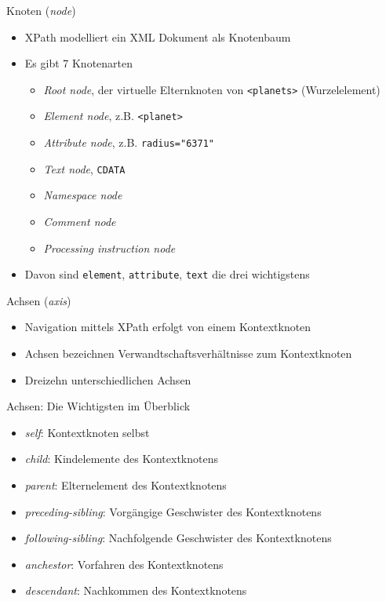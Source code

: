 \documentclass{beamer}
\begin{document}
\begin{frame}{Knoten (\emph{node})}
	
	\begin{itemize}
		\item XPath modelliert ein XML Dokument als Knotenbaum
		\item Es gibt 7 Knotenarten
		\begin{itemize}
			\item \emph{Root node}, der virtuelle Elternknoten von \texttt{<planets>} (Wurzelelement)
			\item \emph{Element node}, z.B. \texttt{<planet>}
			\item \emph{Attribute node}, z.B. \texttt{radius="6371"}
			\item \emph{Text node}, \texttt{CDATA}
			\item \emph{Namespace node}
			\item \emph{Comment node}
			\item \emph{Processing instruction node}
		\end{itemize}
		\item Davon sind \texttt{element}, \texttt{attribute}, \texttt{text} die drei wichtigstens
	\end{itemize}
	
\end{frame}

\begin{frame}{Achsen (\emph{axis})}
	
	\begin{itemize}
		\item Navigation mittels XPath erfolgt von einem Kontextknoten
		\item Achsen bezeichnen Verwandtschaftsverhältnisse zum Kontextknoten
		\item Dreizehn unterschiedlichen Achsen
	\end{itemize}
	
\end{frame}

\begin{frame}{Achsen: Die Wichtigsten im Überblick}
	
	\begin{itemize}
		\item \emph{self}: Kontextknoten selbst
		\item \emph{child}: Kindelemente des Kontextknotens
		\item \emph{parent}: Elternelement des Kontextknotens
		\item \emph{preceding-sibling}: Vorgängige Geschwister des Kontextknotens
		\item \emph{following-sibling}: Nachfolgende Geschwister des Kontextknotens
		\item \emph{anchestor}: Vorfahren des Kontextknotens
		\item \emph{descendant}: Nachkommen des Kontextknotens
	\end{itemize}
	
\end{frame}
\end{document}
